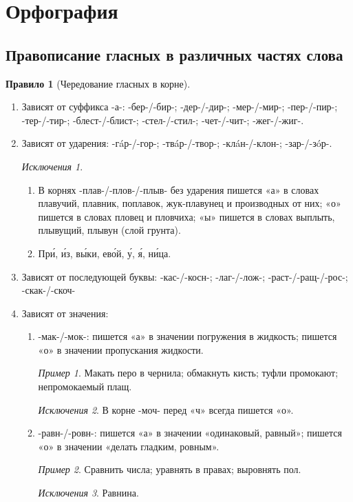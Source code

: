 \documentclass[12pt]{article}
\theoremstyle{definition}
\newtheorem{rrule}{Правило}[section]
\theoremstyle{remark}
\newtheorem*{example}{Пример}
\newtheorem*{exception}{Исключения}
\begin{document}
\section{Орфография}

\subsection{Правописание гласных в различных частях слова}

\begin{rrule}[Чередование гласных в корне]
    \hfill
    \begin{enumerate}
        \item Зависят от суффикса -а-: -бер-/-бир-; -дер-/-дир-; -мер-/-мир-; -пер-/-пир-; -тер-/-тир-; -блест-/-блист-; -стел-/-стил-; -чет-/-чит-; -жег-/-жиг-.
        \item Зависят от ударения: -г\'aр-/-гор-; -тв\'aр-/-твор-; -кл\'aн-/-клон-; -зар-/-з\'oр-.
        \begin{exception}
            \hfill
            \begin{enumerate}
                \item В корнях -плав-/-плов-/-плыв- без ударения пишется «а» в словах плавучий, плавник, поплавок, жук-плавунец и производных от них; «о» пишется в словах пловец и пловчиха; «ы» пишется в словах выплыть, плывущий, плывун (слой грунта).
                \item Пр\'{и}, \'{и}з, в\'{ы}ки, ев\'{о}й, \'{у}, \'{я}, н\'{и}ца.
            \end{enumerate}
        \end{exception}
        \item Зависят от последующей буквы: -кас-/-косн-; -лаг-/-лож-; -раст-/-ращ-/-рос-; -скак-/-скоч-
        \item Зависят от значения:
        \begin{enumerate}
            \item -мак-/-мок-: пишется «а» в значении погружения в жидкость; пишется «о» в значении пропускания жидкости.
            \begin{example}
                Макать перо в чернила; обмакнуть кисть; туфли промокают; непромокаемый плащ.
            \end{example}
            \begin{exception}
                В корне -моч- перед «ч» всегда пишется «о».
            \end{exception}
            \item -равн-/-ровн-: пишется «а» в значении «одинаковый, равный»; пишется «о» в значении «делать гладким, ровным».
            \begin{example}
                Сравнить числа; уравнять в правах; выровнять пол.
            \end{example}
            \begin{exception}
                Равнина.
            \end{exception}
        \end{enumerate}
    \end{enumerate}
\end{rrule}
\end{document}
